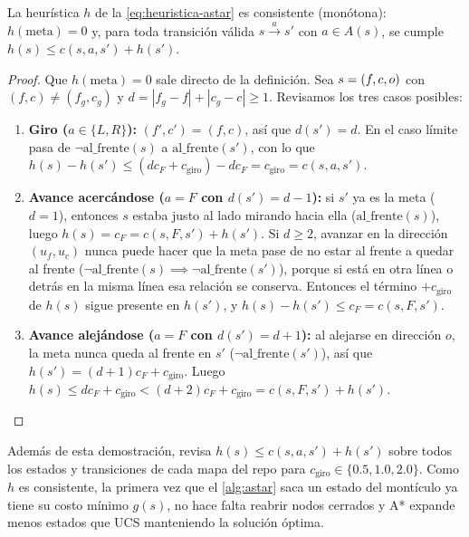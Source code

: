 \begin{proposicion}[Consistencia de $h$]
\label{prop:consistencia}
La heurística $h$ de la \cref{eq:heuristica-astar} es consistente (monótona): $h(\text{meta}) = 0$ y, para toda transición válida $s \xrightarrow{a} s'$ con $a \in A(s)$, se cumple $h(s) \le c(s, a, s') + h(s')$.
\end{proposicion}

\begin{proof}
Que $h(\text{meta}) = 0$ sale directo de la definición. Sea $s = (f,c,o)$ con $(f, c) \ne (f_g, c_g)$ y $d = |f_g - f| + |c_g - c| \ge 1$. Revisamos los tres casos posibles:
\begin{enumerate}[leftmargin=1.6em,itemsep=2pt]
  \item \textbf{Giro ($a \in \{L, R\}$):} $(f', c') = (f, c)$, así que $d(s') = d$. En el caso límite pasa de $\neg\mathrm{al\_frente}(s)$ a $\mathrm{al\_frente}(s')$, con lo que $h(s) - h(s') \le (d c_F + c_{\text{giro}}) - d c_F = c_{\text{giro}} = c(s, a, s')$.
  \item \textbf{Avance acercándose ($a = F$ con $d(s') = d - 1$):} si $s'$ ya es la meta ($d = 1$), entonces $s$ estaba justo al lado mirando hacia ella ($\mathrm{al\_frente}(s)$), luego $h(s) = c_F = c(s, F, s') + h(s')$. Si $d \ge 2$, avanzar en la dirección $(u_f, u_c)$ nunca puede hacer que la meta pase de no estar al frente a quedar al frente ($\neg\mathrm{al\_frente}(s) \implies \neg\mathrm{al\_frente}(s')$), porque si está en otra línea o detrás en la misma línea esa relación se conserva. Entonces el término $+c_{\text{giro}}$ de $h(s)$ sigue presente en $h(s')$, y $h(s) - h(s') \le c_F = c(s, F, s')$.
  \item \textbf{Avance alejándose ($a = F$ con $d(s') = d + 1$):} al alejarse en dirección $o$, la meta nunca queda al frente en $s'$ ($\neg\mathrm{al\_frente}(s')$), así que $h(s') = (d + 1)c_F + c_{\text{giro}}$. Luego $h(s) \le d c_F + c_{\text{giro}} < (d + 2)c_F + c_{\text{giro}} = c(s, F, s') + h(s')$.
\end{enumerate}
\end{proof}

Además de esta demostración,  revisa $h(s) \le c(s, a, s') + h(s')$ sobre todos los estados y transiciones de cada mapa del repo para $c_{\text{giro}} \in \{0.5, 1.0, 2.0\}$. Como $h$ es consistente, la primera vez que el \cref{alg:astar} saca un estado del montículo ya tiene su costo mínimo $g(s)$, no hace falta reabrir nodos cerrados y A* expande menos estados que UCS manteniendo la solución óptima.

